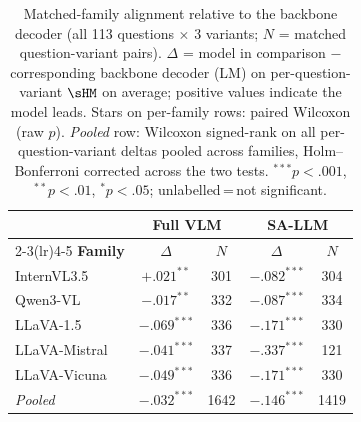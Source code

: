 \begin{table}[ht]
\centering\small\setlength{\tabcolsep}{5pt}
\begin{tabular}{l cc cc}
\toprule
& \multicolumn{2}{c}{\textbf{Full VLM}} & \multicolumn{2}{c}{\textbf{SA-LLM}} \\
\cmidrule(lr){2-3}\cmidrule(lr){4-5}
\textbf{Family} & $\Delta$ & $N$ & $\Delta$ & $N$ \\
\midrule
InternVL3.5 & $+.021^{**}$ & 301 & $-.082^{***}$ & 304 \\
Qwen3-VL & $-.017^{**}$ & 332 & $-.087^{***}$ & 334 \\
LLaVA-1.5 & $-.069^{***}$ & 336 & $-.171^{***}$ & 330 \\
LLaVA-Mistral & $-.041^{***}$ & 337 & $-.337^{***}$ & 121 \\
LLaVA-Vicuna & $-.049^{***}$ & 336 & $-.171^{***}$ & 330 \\
\midrule
\textit{Pooled} & $-.032^{***}$ & 1642 & $-.146^{***}$ & 1419 \\
\bottomrule
\end{tabular}
\caption{Matched-family alignment relative to the backbone decoder (all 113 questions $\times$ 3 variants; $N$ = matched question-variant pairs).
$\Delta$ = model in comparison $-$ corresponding backbone decoder (LM) on per-question-variant $\sHM$ on average; positive values indicate the model leads.
Stars on per-family rows: paired Wilcoxon (raw $p$). \textit{Pooled} row: Wilcoxon signed-rank on all per-question-variant deltas pooled across families, Holm--Bonferroni corrected across the two tests. ${}^{***}p{<}.001$, ${}^{**}p{<}.01$, ${}^{*}p{<}.05$; unlabelled\,=\,not significant.}
\label{tab:matched_family_alignment_tests}
\end{table}